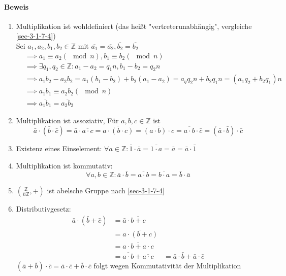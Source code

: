 \documentclass[a4paper]{scrartcl}
\DeclareMathOperator{\Forall}{\forall}
\theoremstyle{definition}
\theoremstyle{plain}
\theoremstyle{plain}
\theoremstyle{remark}
\theoremstyle{remark}
\theoremstyle{remark}
\theoremstyle{remark}
\theoremstyle{remark}
\begin{document}
\paragraph{Beweis}
\label{sec-3-2-4-1}
\begin{enumerate}
\item Multiplikation ist wohldefiniert (das heißt "vertreterunabhängig", vergleiche \ref{sec-3-1-7-4}) \\
        Sei $a_1,a_2,b_1,b_2 \in\mathbb{Z}$ mit $\overline{a_1} = \overline{a_2},\overline{b_2} = \overline{b_2}$
\begin{align}
&\implies a_1 \equiv a_2 (\mod n), b_1\equiv b_2 (\mod n) \\
&\implies \exists q_1,q_2\in\mathbb{Z}:a_1 - a_2 = q_1 n, b_1 - b_2 = q_2 n \\
&\implies a_1 b_2 - a_2 b_2 = a_1(b_1 - b_2) + b_2 (a_1 - a_2) = a_q q_2 n + b_2 q_1 n = (a_1 q_2 + b_2 q_1) n \\
&\implies a_1 b_1 \equiv a_2 b_2 (\mod n) \\
&\implies \overline{a_1 b_1} = \overline{a_2 b_2}
\end{align}
\item Multiplikation ist assoziativ, Für $a,b,c\in\mathbb{Z}$ ist
\[\bar a\cdot (\bar b\cdot \bar c) = \bar a \cdot \overline{a\cdot c} = \overline{a\cdot(b\cdot c)} = \overline{(a\cdot b)\cdot c} = \overline{a\cdot b} \cdot \bar c = (\bar a\cdot \bar b) \cdot \bar c\]
\item Existenz eines Einselement: $\Forall a\in\mathbb{Z}:\bar 1 \cdot \bar a = \overline{1\cdot a} = \bar a = \bar a\cdot \bar 1$
\item Multiplikation ist kommutativ:
\[\Forall a,b\in\mathbb{Z}:\bar a\cdot \bar b = \overline{a\cdot b} = \overline{b\cdot a} = \bar b \cdot \bar a\]
\item $(\frac{\mathbb{Z}}{n\mathbb{Z}},+)$ ist abelsche Gruppe nach \ref{sec-3-1-7-4}
\item Distributivgesetz:
\begin{align}
\bar a\cdot (\bar b + \bar c) &= \bar a \cdot \overline{b + c} \\
&= \overline{a\cdot (b + c)} \\
&= \overline{a\cdot b + a\cdot c} \\
&= \overline{a\cdot b} + \overline{a\cdot c}
&= \bar a\cdot \bar b + \bar a \cdot\bar c
\end{align}
$(\bar a + \bar b)\cdot \bar c = \bar a\cdot \bar c + \bar b \cdot \bar c$ folgt wegen Kommutativität der Multiplikation
\end{enumerate}
\end{document}
